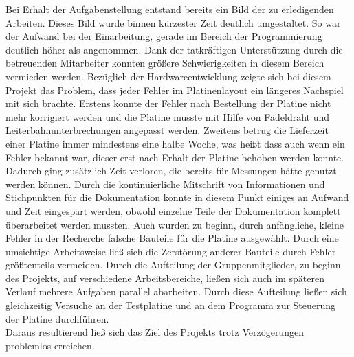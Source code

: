 Bei Erhalt der Aufgabenstellung entstand bereits ein Bild der zu erledigenden Arbeiten. Dieses Bild wurde binnen kürzester Zeit deutlich umgestaltet. So war der Aufwand bei der Einarbeitung, gerade im Bereich der Programmierung deutlich höher als angenommen. Dank der tatkräftigen Unterstützung durch die betreuenden Mitarbeiter konnten größere Schwierigkeiten in diesem Bereich vermieden werden. Bezüglich der Hardwareentwicklung zeigte sich bei diesem Projekt das Problem, dass jeder Fehler im Platinenlayout ein längeres Nachspiel mit sich brachte. Erstens konnte der Fehler nach Bestellung der Platine nicht mehr korrigiert werden und die Platine musste mit Hilfe von Fädeldraht und Leiterbahnunterbrechungen angepasst werden. Zweitens betrug die Lieferzeit einer Platine immer mindestens eine halbe Woche, was heißt dass auch wenn ein Fehler bekannt war, dieser erst nach Erhalt der Platine behoben werden konnte. Dadurch ging zusätzlich Zeit verloren, die bereits für Messungen hätte genutzt werden können. Durch die kontinuierliche Mitschrift von Informationen und Stichpunkten für die Dokumentation konnte in diesem Punkt einiges an Aufwand und Zeit eingespart werden, obwohl einzelne Teile der Dokumentation komplett überarbeitet werden mussten. Auch wurden zu beginn, durch anfängliche, kleine Fehler in der Recherche falsche Bauteile für die Platine ausgewählt. Durch eine umsichtige Arbeitsweise ließ sich die Zerstörung anderer Bauteile durch Fehler größtenteils vermeiden. Durch die Aufteilung der Gruppenmitglieder, zu beginn des Projekts, auf verschiedene Arbeitsbereiche, ließen sich auch im späteren Verlauf mehrere Aufgaben parallel abarbeiten. Durch diese Aufteilung ließen sich gleichzeitig Versuche an der Testplatine und an dem Programm zur Steuerung der Platine durchführen.\\
Daraus resultierend ließ sich das Ziel des Projekts trotz Verzögerungen problemlos erreichen.